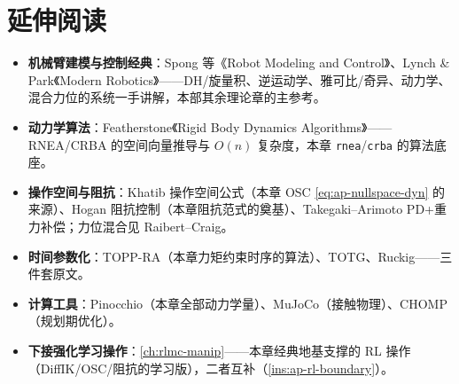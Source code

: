 \section*{延伸阅读}
\begin{itemize}
  \item \textbf{机械臂建模与控制经典}：Spong 等《Robot Modeling and Control》\cite{spong2006robot}、Lynch \& Park《Modern Robotics》\cite{lynch2017modern}——DH/旋量积、逆运动学、雅可比/奇异、动力学、混合力位的系统一手讲解，本部其余理论章的主参考。
  \item \textbf{动力学算法}：Featherstone《Rigid Body Dynamics Algorithms》\cite{featherstone2008rbda}——RNEA/CRBA 的空间向量推导与 $O(n)$ 复杂度，本章 \texttt{rnea}/\texttt{crba} 的算法底座。
  \item \textbf{操作空间与阻抗}：Khatib 操作空间公式\cite{khatib1987operational}（本章 OSC \cref{eq:ap-nullspace-dyn} 的来源）、Hogan 阻抗控制\cite{hogan1985impedance}（本章阻抗范式的奠基）、Takegaki--Arimoto PD+重力补偿\cite{takegaki1981feedback}；力位混合见 Raibert--Craig\cite{raibert1981hybrid}。
  \item \textbf{时间参数化}：TOPP-RA\cite{pham2018toppra}（本章力矩约束时序的算法）、TOTG\cite{kunz2012totg}、Ruckig\cite{berscheid2021ruckig}——三件套原文。
  \item \textbf{计算工具}：Pinocchio\cite{carpentier2019pinocchio}（本章全部动力学量）、MuJoCo\cite{todorov2012mujoco}（接触物理）、CHOMP\cite{zucker2013chomp}（规划期优化）。
  \item \textbf{下接强化学习操作}：\cref{ch:rlmc-manip}——本章经典地基支撑的 RL 操作（DiffIK/OSC/阻抗的学习版），二者互补（\cref{ins:ap-rl-boundary}）。
\end{itemize}

